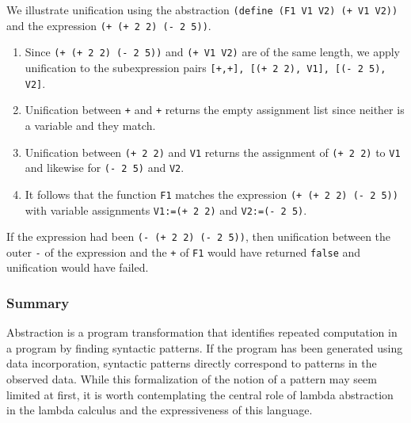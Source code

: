 \documentclass[a4paper,10pt]{article}
\begin{document}
We illustrate unification using the abstraction \texttt{(define (F1 V1 V2) (+ V1 V2))} and the expression \texttt{(+ (+ 2 2) (- 2 5))}.

\begin{enumerate}
  \item Since \texttt{(+ (+ 2 2) (- 2 5))} and \texttt{(+ V1 V2)} are of the same length, we apply unification to the subexpression pairs \texttt{[+,+], [(+ 2 2), V1], [(- 2 5), V2]}.
  \item Unification between \texttt{+} and \texttt{+} returns the empty assignment list since neither is a variable and they match.
  \item Unification between \texttt{(+ 2 2)} and \texttt{V1} returns the assignment of \texttt{(+ 2 2)} to \texttt{V1} and likewise for \texttt{(- 2 5)} and \texttt{V2}.
  \item It follows that the function \texttt{F1} matches the expression \texttt{(+ (+ 2 2) (- 2 5))} with variable assignments \texttt{V1:=(+ 2 2)} and \texttt{V2:=(- 2 5)}.
\end{enumerate}

If the expression had been \texttt{(- (+ 2 2) (- 2 5))}, then unification between the outer \texttt{-} of the expression and the \texttt{+} of \texttt{F1} would have returned \texttt{false} and unification would have failed.

\subsubsection{Summary}

Abstraction is a program transformation that identifies repeated computation in a program by finding syntactic patterns. If the program has been generated using data incorporation, syntactic patterns directly correspond to patterns in the observed data. While this formalization of the notion of a pattern may seem limited at first, it is worth contemplating the central role of lambda abstraction in the lambda calculus and the expressiveness of this language.
\end{document}
